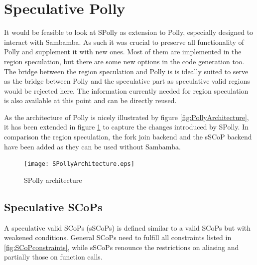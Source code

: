 





\section{Speculative Polly}
It would be feasible to look at SPolly as extension to Polly, especially designed
to interact with Sambamba. As such it was crucial to preserve all functionality 
of Polly and supplement it with new ones. Most of them are
implemented in the region speculation, but there are some new options in the 
code generation too. The bridge between the region speculation and Polly 
is is ideally suited to serve as the 
bridge between Polly and the speculative part as speculative valid regions 
would be rejected here. The information currently needed for region speculation
is also available at this point and can be directly reused. 

As the architecture of Polly is nicely illustrated by figure 
\ref{fig:PollyArchitecture}, it has been extended in figure 
\ref{fig:SPollyArchitecture} to capture the changes introduced by SPolly. 
In comparison the region speculation, the fork join backend and the sSCoP
backend have been added as they can be used without Sambamba. 

\begin{figure}[htbp]
  \centering
  \texttt{[image: SPollyArchitecture.eps]}
  \caption{SPolly architecture}
  \label{fig:SPollyArchitecture}  
\end{figure}


\subsection{Speculative SCoPs}
A speculative valid SCoPs (sSCoPs) is defined similar to a valid SCoPs but with 
weakened conditions. General SCoPs need to fulfill all constraints listed in
\ref{fig:SCoPconstraints}, while sSCoPs renounce the restrictions on aliasing
and partially those on function calls. 


